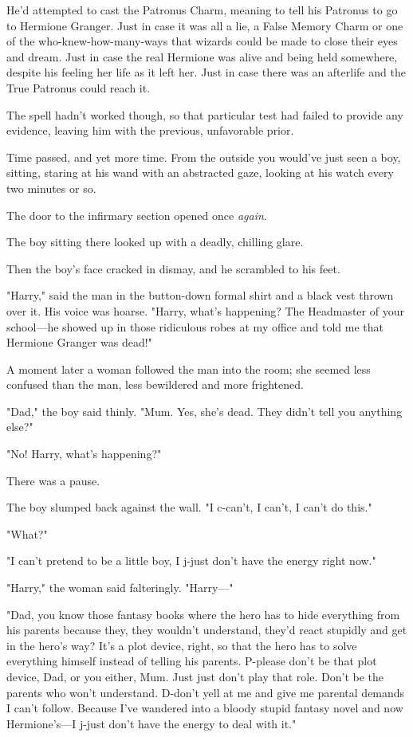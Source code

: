 He'd attempted to cast the Patronus Charm, meaning to tell his Patronus to go
to Hermione Granger. Just in case it was all a lie, a False Memory Charm or one
of the who-knew-how-many-ways that wizards could be made to close their eyes
and dream. Just in case the real Hermione was alive and being held somewhere,
despite his feeling her life as it left her. Just in case there was an
afterlife and the True Patronus could reach it.

The spell hadn't worked though, so that particular test had failed to provide
any evidence, leaving him with the previous, unfavorable prior.

Time passed, and yet more time. From the outside you would've just seen a boy,
sitting, staring at his wand with an abstracted gaze, looking at his watch
every two minutes or so.

The door to the infirmary section opened once \emph{again}.

The boy sitting there looked up with a deadly, chilling glare.

Then the boy's face cracked in dismay, and he scrambled to his feet.

"Harry," said the man in the button-down formal shirt and a black vest thrown
over it. His voice was hoarse. "Harry, what's happening? The Headmaster of your
school—he showed up in those ridiculous robes at my office and told me that
Hermione Granger was dead!"

A moment later a woman followed the man into the room; she seemed less confused
than the man, less bewildered and more frightened.

"Dad," the boy said thinly. "Mum. Yes, she's dead. They didn't tell you
anything else?"

"No! Harry, what's happening?"

There was a pause.

The boy slumped back against the wall. "I c-can't, I can't, I can't do this."

"What?"

"I can't pretend to be a little boy, I j-just don't have the energy right now."

"Harry," the woman said falteringly. "Harry—"

"Dad, you know those fantasy books where the hero has to hide everything from
his parents because they, they wouldn't understand, they'd react stupidly and
get in the hero's way? It's a plot device, right, so that the hero has to solve
everything himself instead of telling his parents. P-please don't be that plot
device, Dad, or you either, Mum. Just{\el} just don't play that role. Don't
be the parents who won't understand. D-don't yell at me and give me parental
demands I can't follow. Because I've wandered into a bloody stupid fantasy
novel and now Hermione's—I j-just don't have the energy to deal with it."

